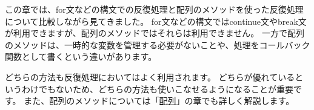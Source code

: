この章では、for文などの構文での反復処理と配列のメソッドを使った反復処理について比較しながら見てきました。
for文などの構文ではcontinue文やbreak文が利用できますが、配列のメソッドではそれらは利用できません。
一方で配列のメソッドは、一時的な変数を管理する必要がないことや、処理をコールバック関数として書くという違いがあります。

どちらの方法も反復処理においてはよく利用されます。
どちらが優れているというわけでもないため、どちらの方法も使いこなせるようになることが重要です。
また、配列のメソッドについては「\hyperlink{array}{配列}」の章でも詳しく解説します。
